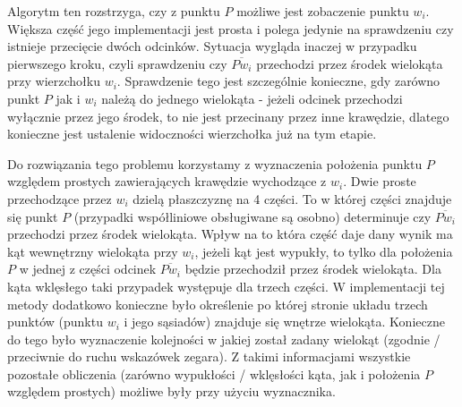 \documentclass{article}
\begin{document}
\qquad Algorytm ten rozstrzyga, czy z punktu $P$ możliwe jest zobaczenie punktu $w_i$. Większa część jego implementacji jest prosta i polega jedynie na sprawdzeniu czy istnieje przecięcie dwóch odcinków. Sytuacja wygląda inaczej w przypadku pierwszego kroku, czyli sprawdzeniu czy $\overline{Pw_i}$ przechodzi przez środek wielokąta przy wierzchołku $w_i$. Sprawdzenie tego jest szczególnie konieczne, gdy zarówno punkt $P$ jak i $w_i$ należą do jednego wielokąta - jeżeli odcinek przechodzi wyłącznie przez jego środek, to nie jest przecinany przez inne krawędzie, dlatego konieczne jest ustalenie widoczności wierzchołka już na tym etapie.

\noindent \qquad Do rozwiązania tego problemu korzystamy z wyznaczenia położenia punktu $P$ względem prostych zawierających krawędzie wychodzące z $w_i$. Dwie proste przechodzące przez $w_i$ dzielą płaszczyznę na 4 części. To  w której części znajduje się punkt $P$ (przypadki współliniowe obsługiwane są osobno) determinuje czy $\overline{Pw_i}$ przechodzi przez środek wielokąta. Wpływ na to która część daje dany wynik ma kąt wewnętrzny wielokąta przy $w_i$, jeżeli kąt jest wypukły, to tylko dla położenia $P$ w jednej z części odcinek $\overline{Pw_i}$ będzie przechodził przez środek wielokąta. Dla kąta wklęsłego taki przypadek występuje dla trzech części. W implementacji tej metody dodatkowo konieczne było określenie po której stronie układu trzech punktów (punktu $w_i$ i jego sąsiadów) znajduje się wnętrze wielokąta. Konieczne do tego było wyznaczenie kolejności w jakiej został zadany wielokąt (zgodnie / przeciwnie do ruchu wskazówek zegara). Z takimi informacjami wszystkie pozostałe obliczenia (zarówno wypukłości / wklęsłości kąta, jak i położenia $P$ względem prostych) możliwe były przy użyciu wyznacznika.
\end{document}
